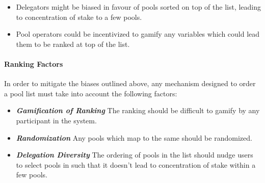 \begin{itemize} [nosep, label=--]
    \item Delegators might be biased in favour of pools sorted  on top of the list, leading to concentration of stake to a few pools. 
    \item Pool operators could be incentivized to gamify any variables which could lead them to be ranked at top of the list. 
\end{itemize}

\paragraph*{Ranking Factors} In order to mitigate the biases outlined above, any mechanism designed to order a pool list must take into account the following factors:
\begin{itemize}[nosep, label=--]
    \item \textit{\textbf{Gamification of Ranking}} The ranking should be difficult to gamify by any participant in the system. 
    \item \textit{\textbf{Randomization}} Any pools which map to the same  should be randomized. 
    \item \textit{\textbf{Delegation Diversity}} The ordering of pools in the list should nudge users to select pools in such that it doesn't lead to concentration of stake within a few pools. 
\end{itemize}


